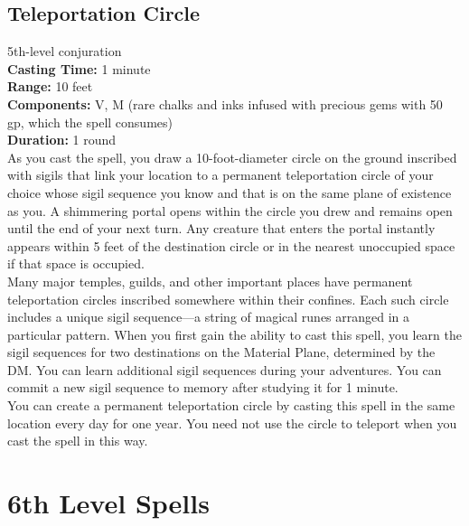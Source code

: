 \documentclass[11pt, A4paper, english]{article}
\begin{document}
		\subsection{Teleportation Circle}
5th-level conjuration \\
\textbf{Casting Time:} 1 minute \\
\textbf{Range:} 10 feet \\
\textbf{Components:} V, M (rare chalks and inks infused with precious gems with 50 gp, which the spell consumes) \\
\textbf{Duration:} 1 round \\
As you cast the spell, you draw a 10-foot-diameter circle on the ground inscribed with sigils that link your location to a permanent teleportation circle of your choice whose sigil sequence you know and that is on the same plane of existence as you. A shimmering portal opens within the circle you drew and remains open until the end of your next turn. Any creature that enters the portal instantly appears within 5 feet of the destination circle or in the nearest unoccupied space if that space is occupied. \\
Many major temples, guilds, and other important places have permanent teleportation circles inscribed somewhere within their confines. Each such circle includes a unique sigil sequence—a string of magical runes arranged in a particular pattern. When you first gain the ability to cast this spell, you learn the sigil sequences for two destinations on the Material Plane, determined by the DM. You can learn additional sigil sequences during your adventures. You can commit a new sigil sequence to memory after studying it for  1 minute. \\
You can create a permanent teleportation circle by casting this spell in the same location every day for one year. You need not use the circle to teleport when you cast the spell in this way.



	\section{6th Level Spells}
\end{document}
